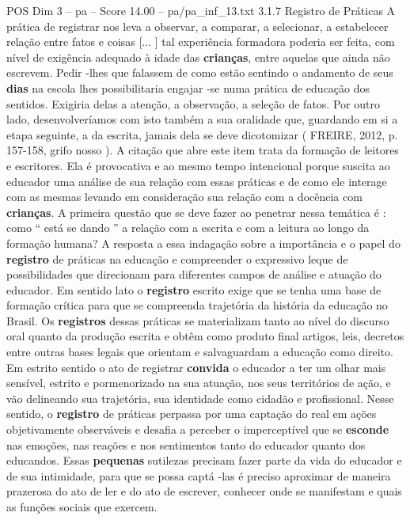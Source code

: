 \begin{textsample}{POS Dim 3 – pa – Score 14.00 – pa/pa\_inf\_13.txt}  \label{ex:f3_pos_238}
3.1.7 Registro de Práticas A prática de registrar nos leva a observar, a comparar, a selecionar, a estabelecer relação entre fatos e coisas [... ] tal experiência formadora poderia ser feita, com nível de exigência adequado à idade das \textbf{crianças}, entre aquelas que ainda não escrevem.
Pedir -lhes que falassem de como estão sentindo o andamento de seus \textbf{dias} na escola lhes possibilitaria engajar -se numa prática de educação dos sentidos.
Exigiria delas a atenção, a observação, a seleção de fatos.
Por outro lado, desenvolveríamos com isto também a sua oralidade que, guardando em si a etapa seguinte, a da escrita, jamais dela se deve dicotomizar ( FREIRE, 2012, p. 157-158, grifo nosso ).
A citação que abre este item trata da formação de leitores e escritores.
Ela é provocativa e ao mesmo tempo intencional porque suscita ao educador uma análise de sua relação com essas práticas e de como ele interage com as mesmas levando em consideração sua relação com a docência com \textbf{crianças}.
A primeira questão que se deve fazer ao penetrar nessa temática é : como “ está se dando ” a relação com a escrita e com a leitura ao longo da formação humana?
A resposta a essa indagação sobre a importância e o papel do \textbf{registro} de práticas na educação e compreender o expressivo leque de possibilidades que direcionam para diferentes campos de análise e atuação do educador.
Em sentido lato o \textbf{registro} escrito exige que se tenha uma base de formação crítica para que se compreenda trajetória da história da educação no Brasil.
Os \textbf{registros} dessas práticas se materializam tanto ao nível do discurso oral quanto da produção escrita e obtêm como produto final artigos, leis, decretos entre outras bases legais que orientam e salvaguardam a educação como direito.
Em estrito sentido o ato de registrar \textbf{convida} o educador a ter um olhar mais sensível, estrito e pormenorizado na sua atuação, nos seus territórios de ação, e vão delineando sua trajetória, sua identidade como cidadão e profissional.
Nesse sentido, o \textbf{registro} de práticas perpassa por uma captação do real em ações objetivamente observáveis e desafia a perceber o imperceptível que se \textbf{esconde} nas emoções, nas reações e nos sentimentos tanto do educador quanto dos educandos.
Essas \textbf{pequenas} sutilezas precisam fazer parte da vida do educador e de sua intimidade, para que se possa captá -las é preciso aproximar de maneira prazerosa do ato de ler e do ato de escrever, conhecer onde se manifestam e quais as funções sociais que exercem.

\end{textsample}
